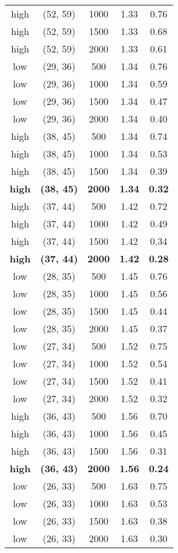 \begin{tabular}{c c c c c}
high & (52, 59) &  1000 & 1.33 & 0.76 \\
high & (52, 59) &  1500 & 1.33 & 0.68 \\
high & (52, 59) &  2000 & 1.33 & 0.61 \\
low & (29, 36) &  500 & 1.34 & 0.76 \\
low & (29, 36) &  1000 & 1.34 & 0.59 \\
low & (29, 36) &  1500 & 1.34 & 0.47 \\
low & (29, 36) &  2000 & 1.34 & 0.40 \\
high & (38, 45) &  500 & 1.34 & 0.74 \\
high & (38, 45) &  1000 & 1.34 & 0.53 \\
high & (38, 45) &  1500 & 1.34 & 0.39 \\
\textbf{high} & \textbf{(38, 45)} & \textbf{ 2000} & \textbf{1.34} & \textbf{0.32} \\
high & (37, 44) &  500 & 1.42 & 0.72 \\
high & (37, 44) &  1000 & 1.42 & 0.49 \\
high & (37, 44) &  1500 & 1.42 & 0.34 \\
\textbf{high} & \textbf{(37, 44)} & \textbf{ 2000} & \textbf{1.42} & \textbf{0.28} \\
low & (28, 35) &  500 & 1.45 & 0.76 \\
low & (28, 35) &  1000 & 1.45 & 0.56 \\
low & (28, 35) &  1500 & 1.45 & 0.44 \\
low & (28, 35) &  2000 & 1.45 & 0.37 \\
low & (27, 34) &  500 & 1.52 & 0.75 \\
low & (27, 34) &  1000 & 1.52 & 0.54 \\
low & (27, 34) &  1500 & 1.52 & 0.41 \\
low & (27, 34) &  2000 & 1.52 & 0.32 \\
high & (36, 43) &  500 & 1.56 & 0.70 \\
high & (36, 43) &  1000 & 1.56 & 0.45 \\
high & (36, 43) &  1500 & 1.56 & 0.31 \\
\textbf{high} & \textbf{(36, 43)} & \textbf{ 2000} & \textbf{1.56} & \textbf{0.24} \\
low & (26, 33) &  500 & 1.63 & 0.75 \\
low & (26, 33) &  1000 & 1.63 & 0.53 \\
low & (26, 33) &  1500 & 1.63 & 0.38 \\
low & (26, 33) &  2000 & 1.63 & 0.30 \\

\end{tabular}
